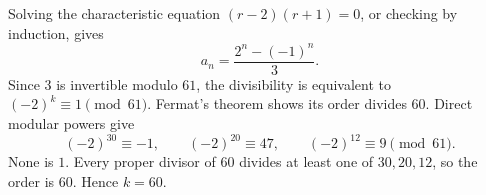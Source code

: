 Solving the characteristic equation $(r-2)(r+1)=0$, or checking by induction, gives
\[
a_n=\dfrac{2^n-(-1)^n}{3}.
\]
Since $3$ is invertible modulo $61$, the divisibility is equivalent to $(-2)^k\equiv1\pmod{61}$. Fermat's theorem shows its order divides $60$. Direct modular powers give
\[
(-2)^{30}\equiv-1,\qquad (-2)^{20}\equiv47,\qquad (-2)^{12}\equiv9\pmod{61}.
\]
None is $1$. Every proper divisor of $60$ divides at least one of $30,20,12$, so the order is $60$. Hence $\boxed{k=60}$.
